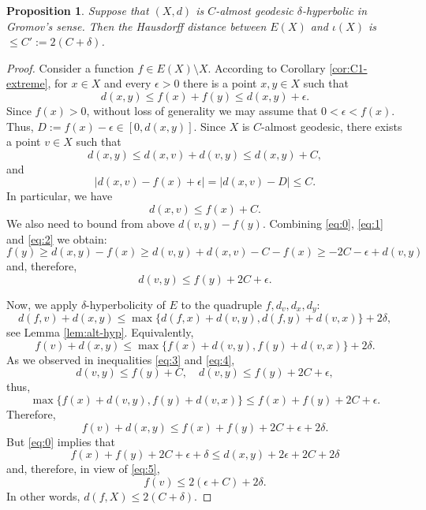 \documentclass[12pt]{amsbook}%
\newtheorem{prop}[thm]{Proposition}
\theoremstyle{definition}
\theoremstyle{remark}
\numberwithin{section}{chapter}
\numberwithin{subsection}{section}
\numberwithin{figure}{chapter}
\def\eps{\epsilon}
\begin{document}
\begin{prop}\label{prop:almost}
Suppose that $(X,d)$ is $C$-almost geodesic $\delta$-hyperbolic in Gromov's sense. 
Then the Hausdorff distance between $E(X)$ and $\iota(X)$ is $\leqslant C':=2(C+\delta)$. 
\end{prop}
\begin{proof} Consider a function $f\in E(X)\setminus X$. According to Corollary \ref{cor:C1-extreme}, for $x\in X$ and every $\eps>0$ there is a point $x, y\in X$ such that 
\begin{equation}\label{eq:0}
d(x,y)\leqslant f(x)+f(y)\leqslant d(x, y) +\eps. 
\end{equation}
Since $f(x)>0$, without loss of generality we may assume that $0<\eps<f(x)$. Thus, 
$D:=f(x)-\eps\in [0, d(x,y)]$. Since $X$ is $C$-almost geodesic, there exists a point $v\in X$ such that 
\begin{equation}\label{eq:1}
d(x,y)\leqslant d(x,v)+ d(v, y) \leqslant d(x,y) +C,
\end{equation}
and
\begin{equation}\label{eq:2}
|d(x,v)-f(x)+\eps|=|d(x, v)- D|\leqslant C. 
\end{equation}
In particular, we have
\begin{equation}\label{eq:3}
d(x,v)\leqslant f(x)+C.  
\end{equation}
We also need to bound from above $d(v,y)-f(y)$.  Combining \eqref{eq:0}, \eqref{eq:1} and \eqref{eq:2} we obtain:
$$
f(y)\geqslant d(x,y) - f(x)\geqslant d(v,y) + d(x,v)  - C - f(x)\geqslant -2C -\eps + d(v,y) 
$$
and, therefore, 
\begin{equation}\label{eq:4}
d(v,y)\leqslant f(y) + 2C +\eps. 
\end{equation}


Now, we apply $\delta$-hyperbolicity of $E$ to the quadruple $f, d_v, d_x, d_y$:
$$
d(f, v) + d(x,y)\leqslant \max\{d(f, x)+ d(v,y), d(f,y) + d(v,x)\} +2\delta,
$$
see Lemma \ref{lem:alt-hyp}. Equivalently, 
\begin{equation}\label{eq:5}
f (v) + d(x, y) \leqslant \max \{f (x) + d(v, y), f (y) + d(v, x)\} + 2\delta.
\end{equation}
As we observed in inequalities \eqref{eq:3} and \eqref{eq:4},
$$
d(v,y)\leqslant f(y) + C, \quad d(v,y)\leqslant f(y) + 2C +\eps,
$$
thus,
$$
\max \{f (x) + d(v, y), f (y) + d(v, x)\} \leqslant f(x) + f(y) +2C+\eps. 
$$
Therefore,
$$
f(v) + d(x,y)\leqslant  f(x) + f(y) +2C+\eps +2\delta. 
$$
But \eqref{eq:0} implies that
$$
f(x)+f(y) + 2C+\eps+\delta\leqslant d(x,y)+2\eps + 2C+2\delta 
$$
and, therefore, in view of \eqref{eq:5}, 
$$
f(v)\leqslant 2(\eps + C)+2\delta. 
$$
In other words, $d(f, X)\leqslant 2(C+\delta)$. 
\end{proof}
\end{document}
